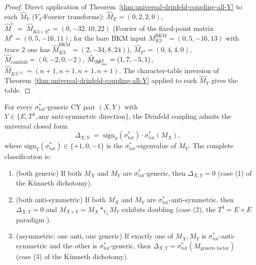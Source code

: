 \begin{proof}
Direct application of Theorem~\ref{thm:universal-drinfeld-coupling-all-Y} to
each $\hat M_Y$ \textup{(}$V_4$-Fourier transforms\textup{):}
$\hat M_E = (0, 2, 2, 0)$,
$\hat M^\flat \;=\; \hat M_{K3 \times E^k} = (0, -32, 10, 22)$
\textup{(}Fourier of the fixed-point matrix $M^\flat = (0, 5, -16, 11)$;
for the bare BKM input $M_{K3}^{\mathrm{BKM}} = (0, 5, -16, 13)$ with
trace $2$ one has $\hat M_{K3}^{\mathrm{BKM}} = (2, -34, 8, 24)$\textup{),}
$\hat M_{T^4} = (0, 4, 4, 0)$,
$\hat M_{\mathrm{conifold}} = (0, -2, 0, -2)$,
$\hat M_{\bP^2_{\mathrm{loc}}} = (1, 7, -5, 1)$,
$\hat M_{K3^{[n]}} = (n+1, n+1, n+1, n+1)$.
The character-table inversion of Theorem~\ref{thm:universal-drinfeld-coupling-all-Y}
applied to each $\hat M_Y$ gives the table.
\end{proof}

\begin{corollary}
\label{cor:universal-drinfeld-coupling-Y-formula}
For every $\sigma_{\mathrm{tot}}^*$-generic CY pair $(X, Y)$ with $Y \in
\{E, T^4, \text{any anti-symmetric direction}\}$, the Drinfeld coupling
admits the universal closed form
\[
 \boxed{\;
 \Delta_{X, Y}
 \;=\; \mathrm{sign}_Y(\sigma_{\mathrm{tot}}^*) \cdot
 \sigma_{\mathrm{tot}}^*(M_X),
 \;}
\]
where $\mathrm{sign}_Y(\sigma_{\mathrm{tot}}^*) \in \{+1, 0, -1\}$ is the
$\sigma_{\mathrm{tot}}^*$-eigenvalue of $M_Y$. The complete classification is:
\begin{enumerate}[label=\textup{(\arabic*)}]
 \item \textup{(both generic)} If both $M_X$ and $M_Y$ are
 $\sigma_{\mathrm{tot}}^*$-generic, then $\Delta_{X, Y} = 0$
 \textup{(}case \textup{(1)} of the Künneth dichotomy\textup{).}
 \item \textup{(both anti-symmetric)} If both $M_X$ and $M_Y$ are
 $\sigma_{\mathrm{tot}}^*$-anti-symmetric, then $\Delta_{X, Y} = 0$
 and $M_{X \times Y} = M_X *_{V_4} M_Y$ exhibits doubling
 \textup{(}case \textup{(2)}, the $T^4 = E \times E$ paradigm
 \textup{).}
 \item \textup{(asymmetric: one anti, one generic)} If exactly one of
 $M_X, M_Y$ is $\sigma_{\mathrm{tot}}^*$-anti-symmetric and the other
 is $\sigma_{\mathrm{tot}}^*$-generic, then
 $\Delta_{X, Y} = \sigma_{\mathrm{tot}}^*(M_{\text{generic-factor}})$
 \textup{(}case \textup{(3)} of the Künneth dichotomy\textup{).}
\end{enumerate}
\end{corollary}

